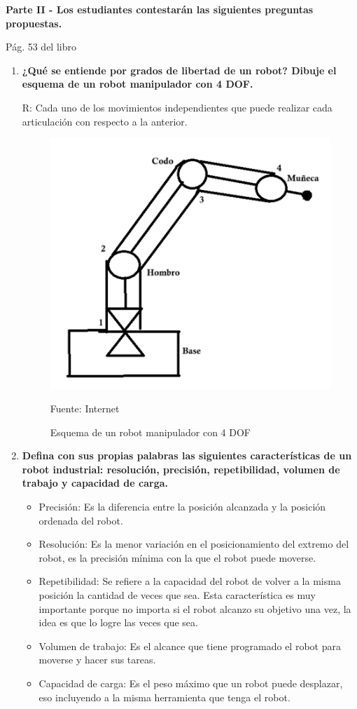 \textbf{Parte II - Los estudiantes contestarán las siguientes preguntas propuestas.
}

Pág. 53 del libro

\begin{enumerate}
    \item \textbf{¿Qué se entiende por grados de libertad de un robot? Dibuje el esquema de un robot manipulador con 4 DOF.}

    R: Cada uno de los movimientos independientes que puede realizar cada articulación con respecto a la anterior.

    \begin{figure}[H]
        \centering
        \includegraphics[scale = 0.90]{Imagenes/p1.png}
        \caption{Esquema de un robot manipulador con 4 DOF}{Fuente: Internet}
    \end{figure}

    \item \textbf{Defina con sus propias palabras las siguientes características de un robot industrial: resolución, precisión, repetibilidad, volumen de trabajo y capacidad de carga.}
    
    \begin{itemize}


        \item Precisión: Es la diferencia entre la posición alcanzada y la posición ordenada del robot. 
        \item Resolución: Es la menor variación en el posicionamiento del extremo del robot, es la precisión mínima con la que el robot puede moverse. 
        \item Repetibilidad: Se refiere a la capacidad del robot de volver a la misma posición la cantidad de veces que sea. Esta característica es muy importante porque no importa si el robot alcanzo su objetivo una vez, la idea es que lo logre las veces que sea.
        \item Volumen de trabajo: Es el alcance que tiene programado el robot para moverse y hacer sus tareas.
        \item Capacidad de carga: Es el peso máximo que un robot puede desplazar, eso incluyendo a la misma herramienta que tenga el robot. 
        

\end{itemize}
\end{enumerate}
